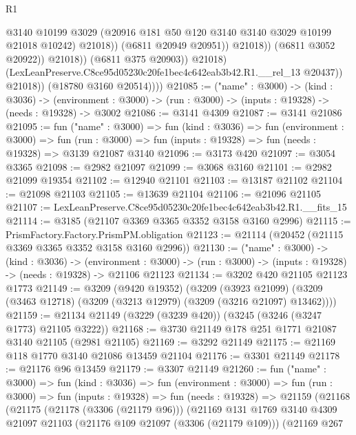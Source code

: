 \begin{lexlean}{R1}
\begin{coremodule}
                                    @3140
                                    @10199
                                    @3029
                                    (@20916 @181 @50 @120 @3140 @3140 @3029 @10199 @21018 @10242)
                                    @21018))
                                (@6811 @20949 @20951))
                              @21018))
                          (@6811 @3052 @20922))
                        @21018))
                    (@6811 @375 @20903))
                  @21018)
                (LexLeanPreserve.C8ce95d05230c20fe1bec4c642eab3b42.R1.__rel_13 @20437))
              @21018))
          (@18780 @3160 @20514))))
@21085 := ("name" : @3000) ->
  (kind : @3036) ->
  (environment : @3000) -> (run : @3000) -> (inputs : @19328) -> (needs : @19328) -> @3002
@21086 := @3141 @4309
@21087 := @3141 @21086
@21095 := fun ("name" : @3000) =>
  fun (kind : @3036) =>
  fun (environment : @3000) =>
  fun (run : @3000) => fun (inputs : @19328) => fun (needs : @19328) => @3139 @21087 @3140
@21096 := @3173 @420
@21097 := @3054 @3365
@21098 := @2982 @21097
@21099 := @3068 @3160
@21101 := @2982 @21099 @19354
@21102 := @12940 @21101
@21103 := @13187 @21102
@21104 := @21098 @21103
@21105 := @13639 @21104
@21106 := @21096 @21105
@21107 := LexLeanPreserve.C8ce95d05230c20fe1bec4c642eab3b42.R1.__fits_15
@21114 := @3185 (@21107 @3369 @3365 @3352 @3158 @3160 @2996)
@21115 := PrismFactory.Factory.PrismPM.obligation
@21123 := @21114 (@20452 (@21115 @3369 @3365 @3352 @3158 @3160 @2996))
@21130 := ("name" : @3000) ->
  (kind : @3036) ->
  (environment : @3000) -> (run : @3000) -> (inputs : @19328) -> (needs : @19328) -> @21106 @21123
@21134 := @3202 @420 @21105 @21123 @1773
@21149 := @3209
    (@9420 @19352)
    (@3209
      (@3923 @21099)
      (@3209 (@3463 @12718) (@3209 (@3213 @12979) (@3209 (@3216 @21097) @13462))))
@21159 := @21134 @21149 (@3229 (@3239 @420)) (@3245 (@3246 (@3247 @1773) @21105 @3222))
@21168 := @3730 @21149 @178 @251 @1771 @21087 @3140 @21105 (@2981 @21105)
@21169 := @3292 @21149
@21175 := @21169 @118 @1770 @3140 @21086 @13459 @21104
@21176 := @3301 @21149
@21178 := @21176 @96 @13459
@21179 := @3307 @21149
@21260 := fun ("name" : @3000) =>
  fun (kind : @3036) =>
  fun (environment : @3000) =>
  fun (run : @3000) =>
  fun (inputs : @19328) =>
  fun (needs : @19328) =>
  @21159
    (@21168
      (@21175
        (@21178 (@3306 (@21179 @96)))
        (@21169
          @131
          @1769
          @3140
          @4309
          @21097
          @21103
          (@21176 @109 @21097 (@3306 (@21179 @109)))
          (@21169
            @267

\end{coremodule}
\end{lexlean}
